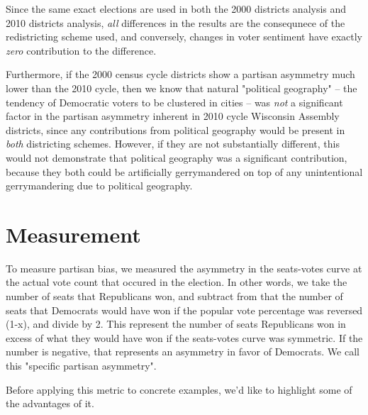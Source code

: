 \documentclass[preprint,12pt]{article}
\begin{document}
Since the same exact elections are used in both the 2000 districts analysis and 2010 districts analysis, \emph{all} differences in the results are the consequnece of the redistricting scheme used, and conversely, changes in voter sentiment have exactly \emph{zero} contribution to the difference.

Furthermore, if the 2000 census cycle districts show a partisan asymmetry much lower than the 2010 cycle, then we know that natural "political geography" -- the tendency of Democratic voters to be clustered in cities -- was \emph{not} a significant factor in the partisan asymmetry inherent in 2010 cycle Wisconsin Assembly districts, since any contributions from political geography would be present in \emph{both} districting schemes.
However, if they are not substantially different, this would not demonstrate that political geography was a significant contribution, because they both could be artificially gerrymandered on top of any unintentional gerrymandering due to political geography.

\section{Measurement}
To measure partisan bias, we measured the asymmetry in the seats-votes curve at the actual vote count that occured in the election.  
In other words, we take the number of seats that Republicans won, and subtract from that the number of seats that Democrats would have won if the popular vote percentage was reversed (1-x), and divide by 2.  
This represent the number of seats Republicans won in excess of what they would have won if the seats-votes curve was symmetric.  
If the number is negative, that represents an asymmetry in favor of Democrats.
We call this "specific partisan asymmetry".

Before applying this metric to concrete examples, we'd like to highlight some of the advantages of it.
\end{document}
